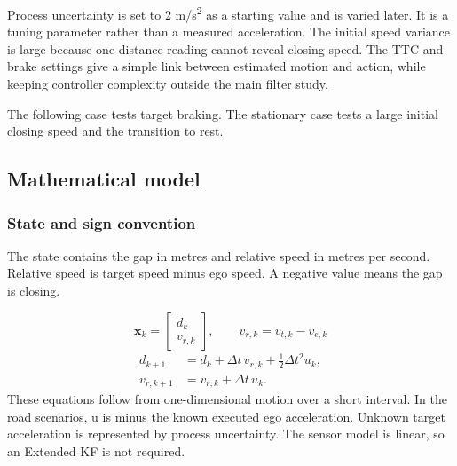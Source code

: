 \documentclass[11pt,a4paper]{article}
\begin{document}
Process uncertainty is set to 2 m/s\textsuperscript{2} as a starting value and is varied later. It is a tuning parameter rather than a measured acceleration. The initial speed variance is large because one distance reading cannot reveal closing speed. The TTC and brake settings give a simple link between estimated motion and action, while keeping controller complexity outside the main filter study.\par

The following case tests target braking. The stationary case tests a large initial closing speed and the transition to rest.\par

\clearpage
{}\subsection{Mathematical model}
\subsubsection{State and sign convention}
The state contains the gap in metres and relative speed in metres per second. Relative speed is target speed minus ego speed. A negative value means the gap is closing.\par

\begin{equation}\mathbf{x}_k=\begin{bmatrix}d_k\\v_{r,k}\end{bmatrix},\qquad v_{r,k}=v_{t,k}-v_{e,k}\end{equation}
\begin{equation}\begin{aligned}d_{k+1}&=d_k+\Delta t\,v_{r,k}+\tfrac12\Delta t^2 u_k,\\v_{r,k+1}&=v_{r,k}+\Delta t\,u_k.\end{aligned}\end{equation}
These equations follow from one-dimensional motion over a short interval. In the road scenarios, u is minus the known executed ego acceleration. Unknown target acceleration is represented by process uncertainty. The sensor model is linear, so an Extended KF is not required.\par
\end{document}
